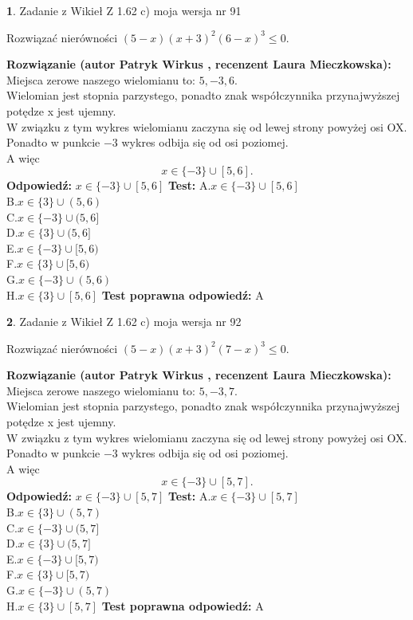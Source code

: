 \documentclass[12pt, a4paper]{article}
\theoremstyle{definition} %
\newtheorem{zad}{}
\newcommand{\zadStart}[1]{\begin{zad}#1\newline}
\newcommand{\zadStop}{\end{zad}}
\newcommand{\rozwStart}[2]{\noindent \textbf{Rozwiązanie (autor #1 , recenzent #2): }\newline}
\newcommand{\rozwStop}{\newline}
\newcommand{\odpStart}{\noindent \textbf{Odpowiedź:}\newline}
\newcommand{\odpStop}{\newline}
\newcommand{\testStart}{\noindent \textbf{Test:}\newline}
\newcommand{\testStop}{\newline}
\newcommand{\kluczStart}{\noindent \textbf{Test poprawna odpowiedź:}\newline}
\newcommand{\kluczStop}{\newline}
\begin{document}
\zadStart{Zadanie z Wikieł Z 1.62 c) moja wersja nr 91}

Rozwiązać nierówności $(5-x)(x+3)^{2}(6-x)^{3}\le0$.
\zadStop
\rozwStart{Patryk Wirkus}{Laura Mieczkowska}
Miejsca zerowe naszego wielomianu to: $5, -3, 6$.\\
Wielomian jest stopnia parzystego, ponadto znak współczynnika przy\linebreak najwyższej potędze x jest ujemny.\\ W związku z tym wykres wielomianu zaczyna się od lewej strony powyżej osi OX.\\
Ponadto w punkcie $-3$ wykres odbija się od osi poziomej.\\
A więc $$x \in \{-3\} \cup [5,6].$$
\rozwStop
\odpStart
$x \in \{-3\} \cup [5,6]$
\odpStop
\testStart
A.$x \in \{-3\} \cup [5,6]$\\
B.$x \in \{3\} \cup (5,6)$\\
C.$x \in \{-3\} \cup (5,6]$\\
D.$x \in \{3\} \cup (5,6]$\\
E.$x \in \{-3\} \cup [5,6)$\\
F.$x \in \{3\} \cup [5,6)$\\
G.$x \in \{-3\} \cup (5,6)$\\
H.$x \in \{3\} \cup [5,6]$
\testStop
\kluczStart
A
\kluczStop



\zadStart{Zadanie z Wikieł Z 1.62 c) moja wersja nr 92}

Rozwiązać nierówności $(5-x)(x+3)^{2}(7-x)^{3}\le0$.
\zadStop
\rozwStart{Patryk Wirkus}{Laura Mieczkowska}
Miejsca zerowe naszego wielomianu to: $5, -3, 7$.\\
Wielomian jest stopnia parzystego, ponadto znak współczynnika przy\linebreak najwyższej potędze x jest ujemny.\\ W związku z tym wykres wielomianu zaczyna się od lewej strony powyżej osi OX.\\
Ponadto w punkcie $-3$ wykres odbija się od osi poziomej.\\
A więc $$x \in \{-3\} \cup [5,7].$$
\rozwStop
\odpStart
$x \in \{-3\} \cup [5,7]$
\odpStop
\testStart
A.$x \in \{-3\} \cup [5,7]$\\
B.$x \in \{3\} \cup (5,7)$\\
C.$x \in \{-3\} \cup (5,7]$\\
D.$x \in \{3\} \cup (5,7]$\\
E.$x \in \{-3\} \cup [5,7)$\\
F.$x \in \{3\} \cup [5,7)$\\
G.$x \in \{-3\} \cup (5,7)$\\
H.$x \in \{3\} \cup [5,7]$
\testStop
\kluczStart
A
\kluczStop
\end{document}

